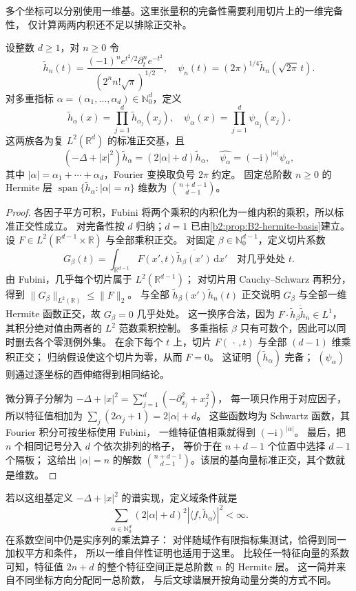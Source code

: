 \ProseParagraphBreak

多个坐标可以分别使用一维基。这里张量积的完备性需要利用切片上的一维完备性，
仅计算两两内积还不足以排除正交补。

\begin{proposition}\label{b2:prop:B2-hermite-tensor}
设整数 \(d\geq1\)，对 \(n\geq0\) 令
\[
 \widetilde h_n(t)=
 \frac{(-1)^ne^{t^2/2}\partial_t^ne^{-t^2}}
 {(2^nn!\sqrt\pi)^{1/2}},
 \quad
 \psi_n(t)=(2\pi)^{1/4}\widetilde h_n(\sqrt{2\pi}\,t).
\]
对多重指标 \(\alpha=(\alpha_1,\ldots,\alpha_d)\in\mathbb N_0^d\)，定义
\[
 \widetilde h_\alpha(x)=\prod_{j=1}^d\widetilde h_{\alpha_j}(x_j),
 \quad
 \psi_\alpha(x)=\prod_{j=1}^d\psi_{\alpha_j}(x_j).
\]
这两族各为复 \(L^2(\mathbb R^d)\) 的标准正交基，且
\[
 (-\Delta+|x|^2)\widetilde h_\alpha
 =(2|\alpha|+d)\widetilde h_\alpha,\quad
 \widehat{\psi_\alpha}=(-\mathrm i)^{|\alpha|}\psi_\alpha,
\]
其中 \(|\alpha|=\alpha_1+\cdots+\alpha_d\)，Fourier 变换取负号 \(2\pi\) 约定。
固定总阶数 \(n\geq0\) 的 Hermite 层
\(\operatorname{span}\{\widetilde h_\alpha:|\alpha|=n\}\)
维数为 \(\binom{n+d-1}{d-1}\)。
\end{proposition}
\begin{proof}
各因子平方可积，Fubini 将两个乘积的内积化为一维内积的乘积，所以标准正交性成立。
对完备性按 \(d\) 归纳；\(d=1\) 已由\cref{b2:prop:B2-hermite-basis}建立。
设 \(F\in L^2(\mathbb R^{d-1}\times\mathbb R)\) 与全部乘积正交。
对固定 \(\beta\in\mathbb N_0^{d-1}\)，定义切片系数
\[
 G_\beta(t)=\int_{\mathbb R^{d-1}}
 F(x',t)\overline{\widetilde h_\beta(x')}\,\mathrm dx'
 \quad\text{对几乎处处 }t.
\]
由 Fubini，几乎每个切片属于 \(L^2(\mathbb R^{d-1})\)；
对切片用 Cauchy--Schwarz 再积分，得到
\(\|G_\beta\|_{L^2(\mathbb R)}\leq\|F\|_2\)。
与全部 \(\widetilde h_\beta(x')\widetilde h_n(t)\) 正交说明
\(G_\beta\) 与全部一维 Hermite 函数正交，故 \(G_\beta=0\) 几乎处处。
这一换序合法，因为
\(F\cdot\overline{\widetilde h_\beta\widetilde h_n}\in L^1\)，
其积分绝对值由两者的 \(L^2\) 范数乘积控制。
多重指标 \(\beta\) 只有可数个，因此可以同时删去各个零测例外集。
在余下每个 \(t\) 上，切片 \(F(\,\cdot\,,t)\) 与全部 \((d-1)\) 维乘积正交；
归纳假设使这个切片为零，从而 \(F=0\)。
这证明 \((\widetilde h_\alpha)\) 完备；
\((\psi_\alpha)\) 则通过逐坐标的酉伸缩得到相同结论。

微分算子分解为
\(-\Delta+|x|^2=\sum_{j=1}^d(-\partial_{x_j}^2+x_j^2)\)，
每一项只作用于对应因子，所以特征值相加为
\(\sum_j(2\alpha_j+1)=2|\alpha|+d\)。
这些函数均为 Schwartz 函数，其 Fourier 积分可按坐标使用 Fubini，
一维特征值相乘就得到 \((-\mathrm i)^{|\alpha|}\)。
最后，把 \(n\) 个相同记号分入 \(d\) 个依次排列的格子，
等价于在 \(n+d-1\) 个位置中选择 \(d-1\) 个隔板；
这给出 \(|\alpha|=n\) 的解数
\(\binom{n+d-1}{d-1}\)。该层的基向量标准正交，其个数就是维数。
\end{proof}

若以这组基定义 \(-\Delta+|x|^2\) 的谱实现，定义域条件就是
\[
 \sum_{\alpha\in\mathbb N_0^d}
 (2|\alpha|+d)^2
 |\langle f,\widetilde h_\alpha\rangle|^2<\infty.
\]
在系数空间中仍是实序列的乘法算子：
对伴随域作有限指标集测试，恰得到同一加权平方和条件，
所以一维自伴性证明也适用于这里。
比较任一特征向量的系数可知，特征值 \(2n+d\) 的整个特征空间正是总阶数 \(n\) 的 Hermite 层。
这一简并来自不同坐标方向分配同一总阶数，
与后文球谐展开按角动量分类的方式不同。
